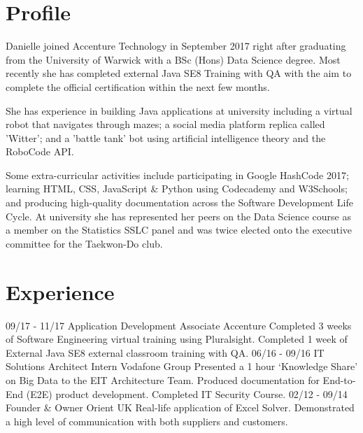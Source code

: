 \documentclass[]{friggeri-cv}
\begin{document}
\section{Profile}
      Danielle joined Accenture Technology in September 2017 right after graduating from the University of Warwick with a BSc (Hons) Data Science degree. Most recently she has completed external Java SE8 Training with QA with the aim to complete the official certification within the next few months.
      
      She has experience in building Java applications at university including a virtual robot that navigates through mazes; a social media platform replica called 'Witter'; and a 'battle tank' bot using artificial intelligence theory and the RoboCode API.
      
      Some extra-curricular activities include participating in Google HashCode 2017; learning HTML, CSS, JavaScript \& Python using Codecademy and W3Schools; and producing high-quality documentation across the Software Development Life Cycle. At university she has represented her peers on the Data Science course as a member on the Statistics SSLC panel and was twice elected onto the executive committee for the Taekwon-Do club.


\section{Experience}
\begin{entrylist}
    \entry
    {09/17 - 11/17}
    {Application Development Associate}
    {Accenture}
    {Completed 3 weeks of Software Engineering virtual training using Pluralsight. Completed 1 week of External Java SE8 external classroom training with QA.}
    \entry
    {06/16 - 09/16}
    {IT Solutions Architect Intern}
    {Vodafone Group}
    {Presented a 1 hour ‘Knowledge Share’ on Big Data to the EIT Architecture Team. Produced documentation for End-to-End (E2E) product development. Completed IT Security Course.}
    \entry
    {02/12 - 09/14}
    {Founder \& Owner}
    {Orient UK}
    {Real-life application of Excel Solver. Demonstrated a high level of communication with both suppliers and customers.}
\end{entrylist}
\end{document}
